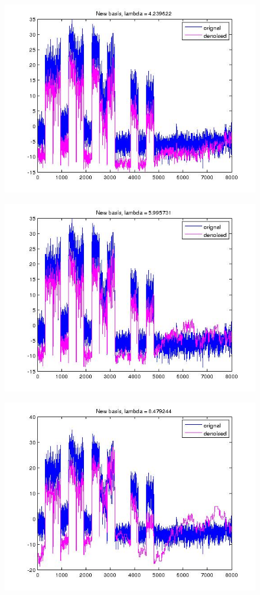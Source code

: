 \documentclass{article}
\begin{document}
\begin{figure}[h]
\centering
\includegraphics[height = 7.3 cm]{new_basis_ofcom_1.jpg}
\caption{}
\label{fig:new_basis_25}
\end{figure}
\begin{figure}[h]
\centering
\includegraphics[height = 7.3 cm]{new_basis_ofcom_2.jpg}
\caption{}
\label{fig:new_basis_25}
\end{figure}
\begin{figure}[h]
\centering
\includegraphics[height = 7.3 cm]{new_basis_ofcom_3.jpg}
\caption{}
\label{fig:new_basis_25}
\end{figure}
\end{document}
